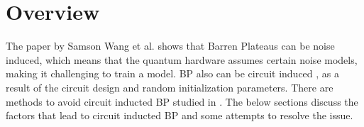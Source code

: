\section{Overview}
The paper \cite{wangNoiseinducedBarrenPlateaus2021} by Samson Wang et al. shows that Barren Plateaus can be noise induced, which means that the quantum hardware assumes certain noise models, making it challenging to train a model. 
BP also can be circuit induced \cite{mccleanBarrenPlateausQuantum2018}, as a result of the circuit design and random initialization parameters.
There are methods to avoid circuit inducted BP studied in \cite{pesahAbsenceBarrenPlateaus2021, cerezoCostFunctionDependent2021,skolikLayerwiseLearningQuantum2021}.
The below sections discuss the factors that lead to circuit inducted BP and some attempts to resolve the issue.